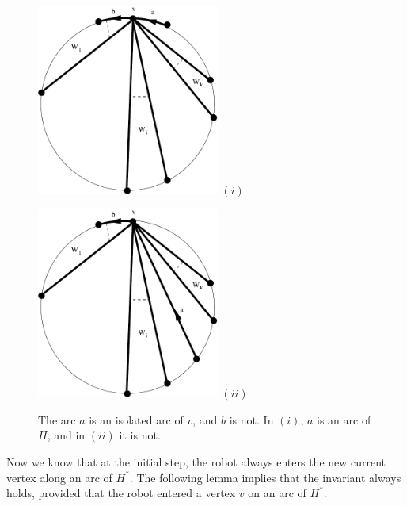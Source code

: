 \documentclass[12pt,letterpaper,oneside]{book}
\begin{document}
\begin{figure}[htp] 
\begin{minipage}[b]{0.5\linewidth}
\centering 
\includegraphics[width=6cm]{onlyaisoh.pdf}
\newline
$(i)$
\end{minipage}
\hspace{0.5cm}
\begin{minipage}[b]{0.5\linewidth}
\centering
\includegraphics[width=6cm]{onlyaiso.pdf}
\newline
$(ii)$
\end{minipage}
\caption[The incoming arc of a vertex is isolated]{The arc $a$ is an isolated arc of $v$, and $b$ is not.  In $(i)$, $a$ is an 
arc of $H$, and in $(ii)$ it is not.  \label{fig:onlyai}}
\end{figure}



Now we know that at the initial step, the robot always enters the new current vertex along an arc of $H^*$.  
The following lemma implies that the invariant always holds, provided that the robot entered a vertex $v$ on an arc of 
$H^*$.  
\end{document}
